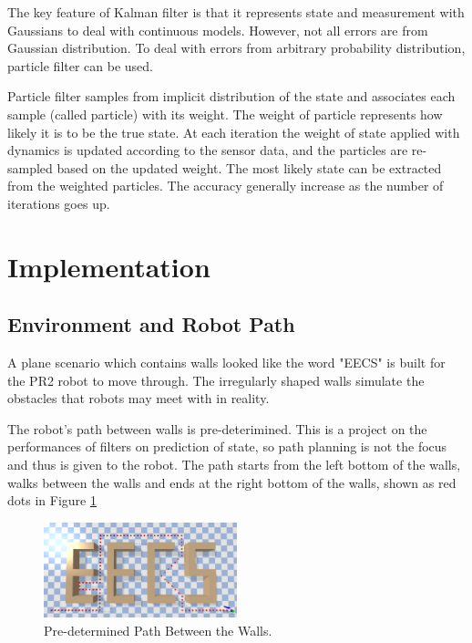 \documentclass[letterpaper,11pt]{article}
\begin{document}
The key feature of Kalman filter is that it represents state and measurement with Gaussians to deal with continuous models. However, not all errors are from Gaussian distribution. To deal with errors from arbitrary probability distribution, particle filter can be used.

Particle filter samples from implicit distribution of the state and associates each sample (called particle) with its weight. The weight of particle represents how likely it is to be the true state. At each iteration the weight of state applied with dynamics is updated according to the sensor data, and the particles are re-sampled based on the updated weight. \cite{particle} The most likely state can be extracted from the weighted particles. The accuracy generally increase as the number of iterations goes up.




\section{Implementation}

\subsection{Environment and Robot Path}
A plane scenario which contains walls looked like the word "EECS" is built for the PR2 robot to move through. The irregularly shaped walls simulate the obstacles that robots may meet with in reality. 

The robot's path between walls is pre-deterimined. This is a project on the performances of filters on prediction of state, so path planning is not the focus and thus is given to the robot. The path starts from the left bottom of the walls, walks between the walls and ends at the right bottom of the walls, shown as red dots in Figure \ref{fig:path}

\begin{figure}[ht] 
	\centering
	\includegraphics[width=0.5\textwidth]{path.png}
	\caption{Pre-determined Path Between the Walls.}
	\label{fig:path}
\end{figure}
\end{document}
